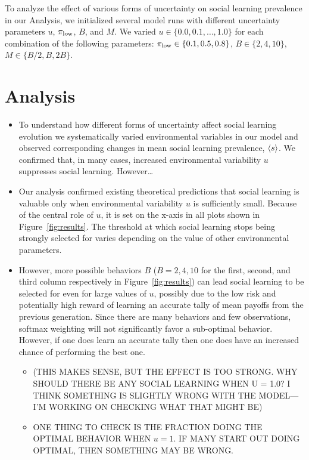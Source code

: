 \documentclass[letterpaper,11.5pt]{scrartcl}
\begin{document}
To analyze the effect of various forms of uncertainty on social learning 
prevalence in our Analysis, we initialized several model runs with
different uncertainty parameters $u$, $\pi_{\mathrm{\mathrm{low}}}$, $B$,
and $M$. We varied $u \in \{0.0, 0.1, \ldots, 1.0\}$ for each combination of
the following parameters:
$\pi_{\mathrm{low}} \in \{0.1, 0.5, 0.8\}$, $B \in \{2, 4, 10\}$, $M \in \{B/2, B, 2B\}$.



\section{Analysis}

\begin{itemize}
  \item 
    To understand how different forms of uncertainty affect social learning evolution
    we systematically varied environmental variables in our model and observed
    corresponding changes in mean social learning prevalence, $\langle s \rangle$. We
    confirmed that, in many cases, increased environmental variability $u$ 
    suppresses social learning. However\ldots 


  \item 
    Our analysis confirmed existing theoretical predictions that social learning
    is valuable only when environmental variability $u$ is sufficiently small.
    Because of the central role of $u$, it is set on the x-axis in
    all plots shown in Figure~\ref{fig:results}. 
    The threshold at which social learning stops being strongly selected for
    varies depending on the value of other environmental parameters. 

  \item 
    However, more possible behaviors $B$ ($B=2,4,10$ for the first, second, and
    third column respectively in Figure~\ref{fig:results}) can lead
    social learning to be selected for even for large values of $u$, possibly
    due to the low risk and potentially high reward of learning an accurate
    tally of mean payoffs from the previous generation. 
    Since there are many behaviors and
    few observations, softmax weighting will not significantly 
    favor a sub-optimal behavior. However, if one does learn an accurate tally
    then one does have an increased chance of performing the best one.
    \begin{itemize}
      \item 
        (THIS MAKES SENSE, BUT THE EFFECT IS TOO STRONG. WHY SHOULD THERE BE ANY
        SOCIAL LEARNING WHEN U = 1.0?  I THINK SOMETHING IS SLIGHTLY WRONG WITH THE
        MODEL---I'M WORKING ON CHECKING WHAT THAT MIGHT BE)
      \item
        ONE THING TO CHECK IS THE FRACTION DOING THE OPTIMAL BEHAVIOR WHEN
        $u=1$. IF MANY START OUT DOING OPTIMAL, THEN SOMETHING MAY BE WRONG.
    \end{itemize}


\end{itemize}
\end{document}
